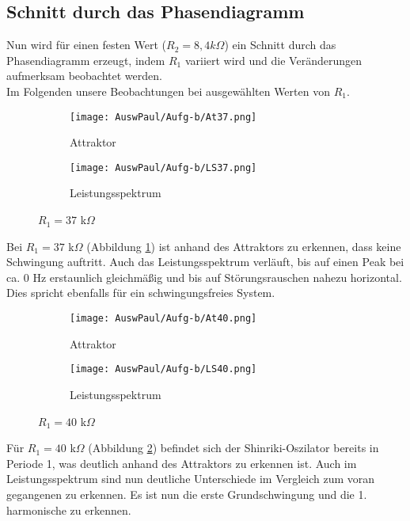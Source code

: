 \subsection{Schnitt durch das Phasendiagramm}
Nun wird für einen festen Wert (\(R_2 = 8,4 k\Omega\)) ein Schnitt durch das Phasendiagramm erzeugt, indem \(R_1\) variiert wird und die Veränderungen aufmerksam beobachtet werden. \\
Im Folgenden unsere Beobachtungen bei ausgewählten Werten von \(R_1\).\\

\begin{figure}[h]
    \centering
    \begin{subfigure}[b]{0.45\textwidth}
        \centering
        \texttt{[image: AuswPaul/Aufg-b/At37.png]}
        \caption{Attraktor}
    \end{subfigure}
    \hfill
    \begin{subfigure}[b]{0.45\textwidth}
        \centering
        \texttt{[image: AuswPaul/Aufg-b/LS37.png]}
        \caption{Leistungsspektrum}
    \end{subfigure}
    \caption{$R_1 = 37$ k$\Omega$}
    \label{fig:A37}
\end{figure}

Bei $R_1 = 37$ k$\Omega$ (Abbildung \ref{fig:A37}) ist anhand des Attraktors zu erkennen, dass keine Schwingung auftritt. Auch das Leistungsspektrum verläuft, bis auf einen Peak bei ca. 0 Hz erstaunlich gleichmäßig und bis auf Störungsrauschen nahezu horizontal. Dies spricht ebenfalls für ein schwingungsfreies System.\\

\begin{figure}[h]
    \centering
    \begin{subfigure}[b]{0.45\textwidth}
        \centering
        \texttt{[image: AuswPaul/Aufg-b/At40.png]}
        \caption{Attraktor}
    \end{subfigure}
    \hfill
    \begin{subfigure}[b]{0.45\textwidth}
        \centering
        \texttt{[image: AuswPaul/Aufg-b/LS40.png]}
        \caption{Leistungsspektrum}
    \end{subfigure}
    \caption{$R_1 = 40$ k$\Omega$}
    \label{fig:A40}
\end{figure}

Für $R_1 =40$ k$\Omega$ (Abbildung \ref{fig:A40}) befindet sich der Shinriki-Oszilator bereits in Periode 1, was deutlich anhand des Attraktors zu erkennen ist. Auch im Leistungsspektrum sind nun deutliche Unterschiede im Vergleich zum voran gegangenen zu erkennen. Es ist nun die erste Grundschwingung und die 1. harmonische zu erkennen.

